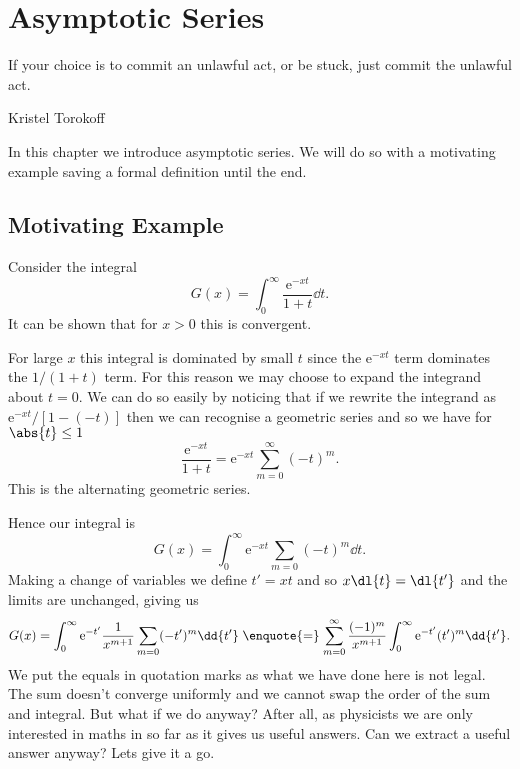 \documentclass[fleqn]{NotesClass}
\newcommand*{\e}{\mathrm{e}}
\begin{document}
    \chapter{Asymptotic Series}
    \epigraph{If your choice is to commit an unlawful act, or be stuck, just commit the unlawful act.}{Kristel Torokoff}
    In this chapter we introduce asymptotic series.
    We will do so with a motivating example saving a formal definition until the end.
    
    \section{Motivating Example}\label{sec:asymptotic series:motivating example}
    Consider the integral
    \begin{equation}
        G(x) = \int_0^{\infty} \frac{\e^{-xt}}{1 + t} \dd{t}.
    \end{equation}
    It can be shown that for \(x > 0\) this is convergent.
    
    For large \(x\) this integral is dominated by small \(t\) since the \(\e^{-xt}\) term dominates the \(1/(1 + t)\) term.
    For this reason we may choose to expand the integrand about \(t = 0\).
    We can do so easily by noticing that if we rewrite the integrand as \(\e^{-xt}/[1-(-t)]\) then we can recognise a geometric series and so we have for \(\abs{t} \le 1\)
    \begin{equation}
        \frac{\e^{-xt}}{1 + t} = \e^{-xt} \sum_{m=0}^{\infty} (-t)^{m}.
    \end{equation}
    This is the alternating geometric series.
    
    Hence our integral is 
    \begin{equation}
        G(x) = \int_{0}^{\infty} \e^{-xt} \sum_{m=0} (-t)^{m}\dd{t}.
    \end{equation}
    Making a change of variables we define \(t' = xt\) and so \(x\dl{t} = \dl{t'}\) and the limits are unchanged, giving us
    \begin{equation}
        G(x) = \int_0^\infty \e^{-t'} \frac{1}{x^{m+1}}\sum_{m=0} (-t')^{m}\dd{t'} \mathrel{\text{\enquote{=}}} \sum_{m=0}^{\infty} \frac{(-1)^m}{x^{m+1}} \int_0^{\infty} \e^{-t'} (t')^m \dd{t'}.
    \end{equation}
    We put the equals in quotation marks as what we have done here is not legal.
    The sum doesn't converge uniformly and we cannot swap the order of the sum and integral.
    But what if we do anyway?
    After all, as physicists we are only interested in maths in so far as it gives us useful answers.
    Can we extract a useful answer anyway?
    Lets give it a go.
    
\end{document}
